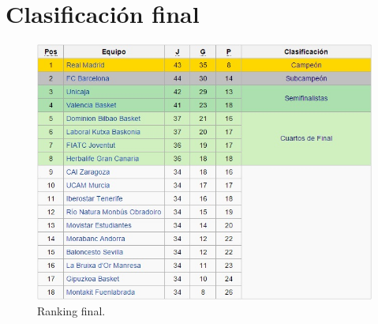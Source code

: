 \section*{Clasificación final}

\begin{figure}[H]
	\centering
	\includegraphics[scale=0.8]{images/final.jpg}
	\caption{Ranking final.} 
\end{figure}